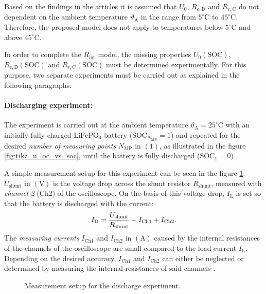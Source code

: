 Based on the findings in the articles \cite{Hausmann:2013, Ala-A.-Hussein:2015, Nejad:2016, Chin:2018} it is assumed that $U_0$,  $R_{e,\mathrm{D}}$ and $R_{e,\mathrm{C}}$ do not dependent on the ambient temperature $\vartheta_{\mathrm{A}}$ in the range from $5^\circ \mathrm{C}$ to $45^\circ \mathrm{C}$. Therefore, the proposed model does not apply to temperatures below $5^\circ \mathrm{C}$ and above $45^\circ \mathrm{C}$.

In order to complete the $R_{\mathrm{int}}$ model, the missing properties $U_0(\mathrm{SOC})$, $R_{\mathrm{e,D}}(\mathrm{SOC})$ and $R_{\mathrm{e,C}}(\mathrm{SOC})$ must be determined experimentally. For this purpose, two separate experiments must be carried out as explained in the following paragraphs.

\paragraph*{Discharging experiment:} %
The experiment is carried out at the ambient temperature $\vartheta_\mathrm{A} = 25^\circ \mathrm{C}$ with an initially fully charged $\mathrm{LiFePO}_4$ battery ($\mathrm{SOC}_{N_\mathrm{MP}} = 1$) and repeated for the desired \emph{number of measuring points} $N_{\mathrm{MP}}$ in $\left( 1 \right)$, as illustrated in the figure \ref{fig:tikz_u_oc_vs_soc}, until the battery is fully discharged ($\mathrm{SOC}_{1} = 0$) \cite{Rahmoun:2012, Hentunen:2014, Gurjer:2019}. 

A simple measurement setup for this experiment can be seen in the figure \ref{fig:tikz_experiment_1}. $U_\mathrm{shunt}$ in $\left(\mathrm{V}\right)$ is the voltage drop across the shunt resistor $R_\mathrm{shunt}$, measured with \emph{channel 2} (Ch2) of the oscilloscope. On the basis of this voltage drop, $I_\mathrm{L}$ is set so that the battery is discharged with the current:
\begin{equation}\label{eq_i_d_real}
	\centering
I_\mathrm{D} = \dfrac{U_\mathrm{shunt}}{R_\mathrm{shunt}} + I_\mathrm{Ch1} + I_\mathrm{Ch2} \text{.}
\end{equation}
The \emph{measuring currents} $I_\mathrm{Ch1}$ and $I_\mathrm{Ch2}$ in $\left(\mathrm{A}\right)$ caused by the internal resistances of the channels of the oscilloscope are small compared to the load current $I_\mathrm{L}$. Depending on the desired accuracy, $I_\mathrm{Ch1}$ and $I_\mathrm{Ch2}$ can either be neglected or determined by measuring the internal resistances of said channels \cite{Schrufer:2014}.  
\begin{figure}[h!]
	\centering
	
	\caption{Measurement setup for the discharge experiment.}
	\label{fig:tikz_experiment_1}
\end{figure}


